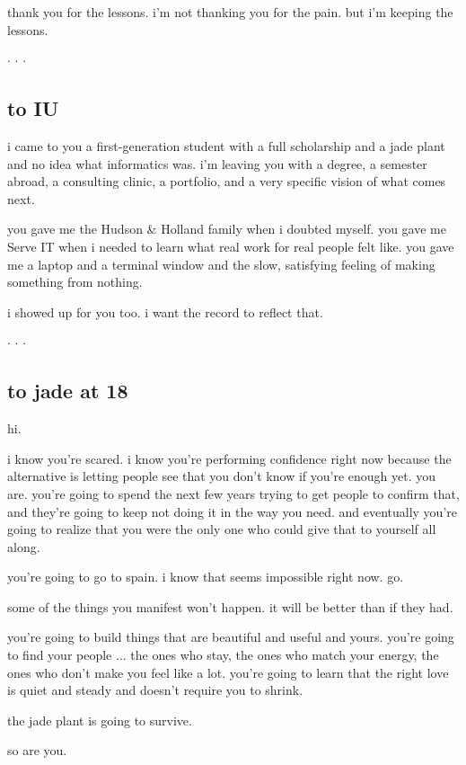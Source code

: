 \documentclass[12pt, letterpaper]{article}
\newcommand{\softbreak}{%
  \begin{center}
    \textcolor{moxie}{\small $\cdot$ \quad $\cdot$ \quad $\cdot$}
  \end{center}
}
\begin{document}
thank you for the lessons. i'm not thanking you for the pain. but i'm keeping the lessons.

\softbreak

\subsection{to IU}

i came to you a first-generation student with a full scholarship and a jade plant and no idea what informatics was. i'm leaving you with a degree, a semester abroad, a consulting clinic, a portfolio, and a very specific vision of what comes next.

you gave me the Hudson \& Holland family when i doubted myself. you gave me Serve IT when i needed to learn what real work for real people felt like. you gave me a laptop and a terminal window and the slow, satisfying feeling of making something from nothing.

i showed up for you too. i want the record to reflect that.

\softbreak

\subsection{to jade at 18}

hi.

i know you're scared. i know you're performing confidence right now because the alternative is letting people see that you don't know if you're enough yet. you are. you're going to spend the next few years trying to get people to confirm that, and they're going to keep not doing it in the way you need. and eventually you're going to realize that you were the only one who could give that to yourself all along.

you're going to go to spain. i know that seems impossible right now. go.

some of the things you manifest won't happen. it will be better than if they had.

you're going to build things that are beautiful and useful and yours. you're going to find your people ... the ones who stay, the ones who match your energy, the ones who don't make you feel like a lot. you're going to learn that the right love is quiet and steady and doesn't require you to shrink.

the jade plant is going to survive.

so are you.

\end{document}
